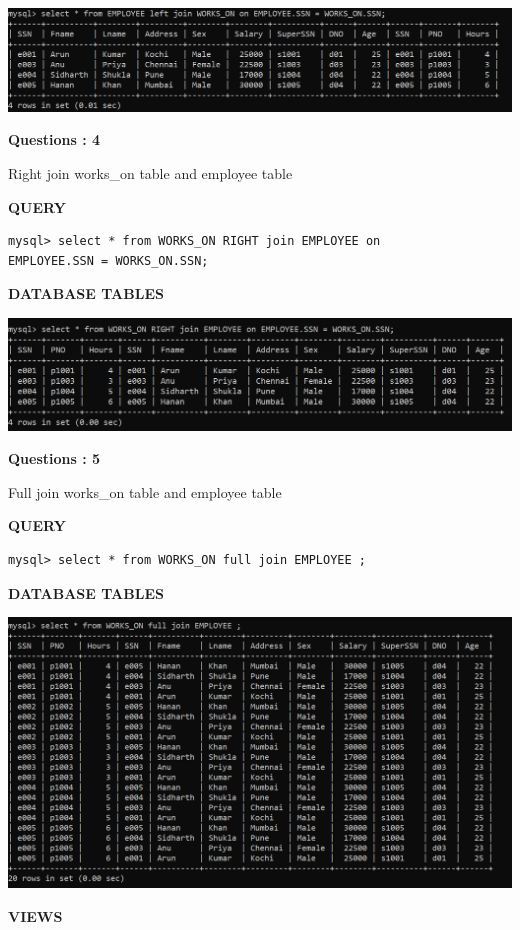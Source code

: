 \documentclass[a4paper,12pt]{report}
\begin{document}
\includegraphics[scale=0.7]{leftjoin.png}
\begin{flushleft}
    \textbf{Questions : 4}
\end{flushleft}
Right join works\_on table and employee table
	\begin{flushleft}
		\textbf{QUERY }
	\end{flushleft}
 \begin{verbatim}
mysql> select * from WORKS_ON RIGHT join EMPLOYEE on 
EMPLOYEE.SSN = WORKS_ON.SSN;
 \end{verbatim}
 
\begin{flushleft}
		\textbf{DATABASE TABLES} 
\end{flushleft} 

\includegraphics[scale=0.7]{rightjoin.png}

\begin{flushleft}
    \textbf{Questions : 5}
\end{flushleft}

Full join works\_on table and employee table

	\begin{flushleft}
		\textbf{QUERY }
	\end{flushleft}
 \begin{verbatim}
mysql> select * from WORKS_ON full join EMPLOYEE ;
 \end{verbatim}
 \newpage
\begin{flushleft}
		\textbf{DATABASE TABLES} 
\end{flushleft} 

\includegraphics[scale=0.7]{fulljoin.png}
\newpage
\begin{center}
		\large\textbf{VIEWS}
	\end{center}
	
\end{document}
